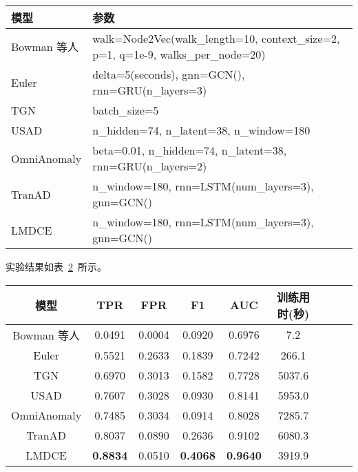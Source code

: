 {\begin{table}[t]
    \label{tab:experiment-compare}
    \centering
    \footnotesize%
    \setlength{\tabcolsep}{4pt}%
    \renewcommand{\arraystretch}{1.2}%
    \begin{tabular}{lp{8cm}}
        \hline
        模型 & 参数\\
        \hline
        Bowman 等人 & walk=Node2Vec(walk\_length=10, context\_size=2, p=1, q=1e-9, walks\_per\_node=20)\\
        Euler & delta=5(seconds), gnn=GCN(), rnn=GRU(n\_layers=3)\\
        TGN & batch\_size=5\\
        USAD & n\_hidden=74, n\_latent=38, n\_window=180\\
        OmniAnomaly & beta=0.01, n\_hidden=74, n\_latent=38, rnn=GRU(n\_layers=2)\\
        TranAD & n\_window=180, rnn=LSTM(num\_layers=3), gnn=GCN()\\
        LMDCE & n\_window=180, rnn=LSTM(num\_layers=3), gnn=GCN()\\
        \hline
    \end{tabular}
\end{table}

实验结果如表~\ref{tab:experiment-compare-result}~所示。

\begin{table}[t]
    \label{tab:experiment-compare-result}
    \centering
    \footnotesize%
    \setlength{\tabcolsep}{4pt}%
    \renewcommand{\arraystretch}{1.2}%
    \begin{tabular}{ccccccccc}
        \hline
        模型 & TPR & FPR & F1 & AUC & 训练用时(秒)\\
        \hline
        Bowman 等人 & 0.0491 & 0.0004 & 0.0920 & 0.6976 & 7.2\\
        Euler & 0.5521 & 0.2633 & 0.1839 & 0.7242 & 266.1\\
        TGN & 0.6970 & 0.3013 & 0.1582 & 0.7728 & 5037.6\\
        USAD & 0.7607 & 0.3028 & 0.0930 & 0.8141 & 5953.0\\
        OmniAnomaly & 0.7485 & 0.3034 & 0.0914 & 0.8028 & 7285.7\\
        TranAD & 0.8037 & 0.0890 & 0.2636 & 0.9102 & 6080.3\\
        LMDCE & \textbf{0.8834} & 0.0510 & \textbf{0.4068} & \textbf{0.9640} & 3919.9\\
        \hline
    \end{tabular}
\end{table}

}

